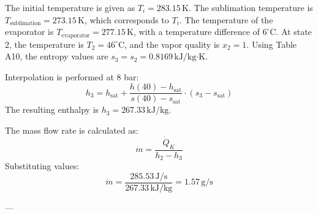 The initial temperature is given as \( T_i = 283.15 \, \text{K} \). The sublimation temperature is \( T_{\text{sublimation}} = 273.15 \, \text{K} \), which corresponds to \( T_i \).  
The temperature of the evaporator is \( T_{\text{evaporator}} = 277.15 \, \text{K} \), with a temperature difference of \( 6^\circ \text{C} \).  
At state 2, the temperature is \( T_2 = 46^\circ \text{C} \), and the vapor quality is \( x_2 = 1 \).  
Using Table A10, the entropy values are \( s_3 = s_2 = 0.8169 \, \text{kJ/kg·K} \).  

Interpolation is performed at 8 bar:  
\[
h_3 = h_{\text{sat}} + \frac{h(40) - h_{\text{sat}}}{s(40) - s_{\text{sat}}} \cdot (s_3 - s_{\text{sat}})
\]  
The resulting enthalpy is \( h_3 = 267.33 \, \text{kJ/kg} \).  

The mass flow rate is calculated as:  
\[
\dot{m} = \frac{\dot{Q}_K}{h_2 - h_3}
\]  
Substituting values:  
\[
\dot{m} = \frac{285.53 \, \text{J/s}}{267.33 \, \text{kJ/kg}} = 1.57 \, \text{g/s}
\]

---